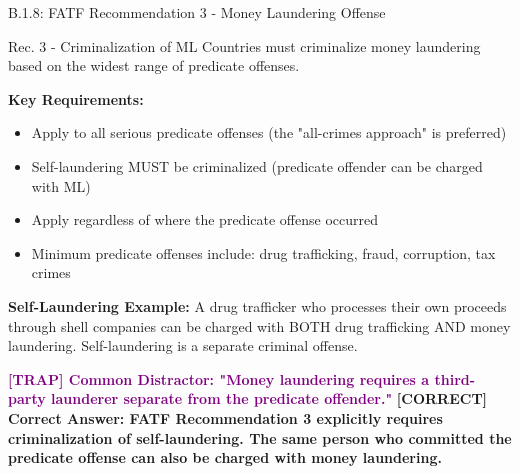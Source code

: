 \documentclass[11pt,a4paper]{beamer}
\newcommand{\trap}[1]{\textcolor{purple}{\textbf{[TRAP] #1}}}
\newcommand{\correct}[1]{\textcolor{green!50!black}{\textbf{[CORRECT] #1}}}
\begin{document}
	\begin{frame}{B.1.8: FATF Recommendation 3 - Money Laundering Offense}
		\begin{block}{Rec. 3 - Criminalization of ML}
			Countries must criminalize money laundering based on the widest range of predicate offenses.
		\end{block}
		\textbf{Key Requirements:}
		\begin{itemize}
			\item Apply to all serious predicate offenses (the "all-crimes approach" is preferred)
			\item Self-laundering MUST be criminalized (predicate offender can be charged with ML)
			\item Apply regardless of where the predicate offense occurred
			\item Minimum predicate offenses include: drug trafficking, fraud, corruption, tax crimes
		\end{itemize}
		\textbf{Self-Laundering Example:}
		A drug trafficker who processes their own proceeds through shell companies can be charged with BOTH drug trafficking AND money laundering. Self-laundering is a separate criminal offense.
		
		\trap{Common Distractor: "Money laundering requires a third-party launderer separate from the predicate offender."}
		\correct{Correct Answer: FATF Recommendation 3 explicitly requires criminalization of self-laundering. The same person who committed the predicate offense can also be charged with money laundering.}
	\end{frame}
	
\end{document}
